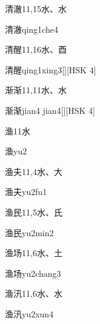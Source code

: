 \begin{entry}{清澈}{11,15}{⽔、⽔}
  \begin{phonetics}{清澈}{qing1che4}
  \end{phonetics}
\end{entry}

\begin{entry}{清醒}{11,16}{⽔、⾣}
  \begin{phonetics}{清醒}{qing1xing3}[][HSK 4]
  \end{phonetics}
\end{entry}

\begin{entry}{渐渐}{11,11}{⽔、⽔}
  \begin{phonetics}{渐渐}{jian4 jian4}[][HSK 4]
  \end{phonetics}
\end{entry}

\begin{entry}{渔}{11}{⽔}
  \begin{phonetics}{渔}{yu2}
  \end{phonetics}
\end{entry}

\begin{entry}{渔夫}{11,4}{⽔、⼤}
  \begin{phonetics}{渔夫}{yu2fu1}
  \end{phonetics}
\end{entry}

\begin{entry}{渔民}{11,5}{⽔、⽒}
  \begin{phonetics}{渔民}{yu2min2}
  \end{phonetics}
\end{entry}

\begin{entry}{渔场}{11,6}{⽔、⼟}
  \begin{phonetics}{渔场}{yu2chang3}
  \end{phonetics}
\end{entry}

\begin{entry}{渔汛}{11,6}{⽔、⽔}
  \begin{phonetics}{渔汛}{yu2xun4}
  \end{phonetics}
\end{entry}

